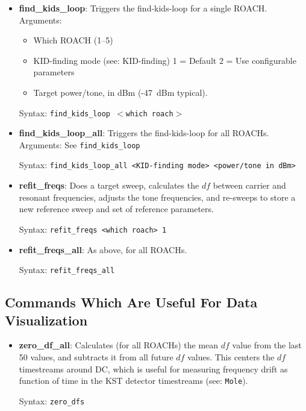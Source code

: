 \begin{itemize}[leftmargin=*,label={}]
\item \textbf{find\_kids\_loop}: Triggers the find-kids-loop for a single ROACH\@.
Arguments:
\begin{itemize}
  \item Which ROACH (1--5)
  \item KID-finding mode (see: KID-finding)
    1 = Default
    2 = Use configurable parameters
  \item Target power/tone, in dBm (-47~dBm typical).
  \end{itemize}

Syntax: \texttt{find\_kids\_loop $<$which roach$>$}

\item \textbf{find\_kids\_loop\_all}: Triggers the find-kids-loop for all ROACHs.
Arguments: See \texttt{find\_kids\_loop}

Syntax: \texttt{find\_kids\_loop\_all <KID-finding mode> <power/tone in dBm>}

\item \textbf{refit\_freqs}: Does a target sweep, calculates the $df$ between carrier and resonant frequencies, adjusts the tone frequencies, and re-sweeps to store a new reference sweep and set of reference parameters.

Syntax: \texttt{refit\_freqs <which roach> 1}

\item \textbf{refit\_freqs\_all}: As above, for all ROACHs.

Syntax: \texttt{refit\_freqs\_all}

\end{itemize}

\subsection{Commands Which Are Useful For Data Visualization}

\begin{itemize}[leftmargin=*,label={}]

\item \textbf{zero\_df\_all}: Calculates (for all ROACHs) the mean $df$ value from the last 50 values, and subtracts it from all future $df$ values. This centers the $df$ timestreams around DC, which is useful for measuring frequency drift as function of time in the KST detector timestreams (see: \texttt{Mole}).

Syntax: \texttt{zero\_dfs}

\end{itemize}

